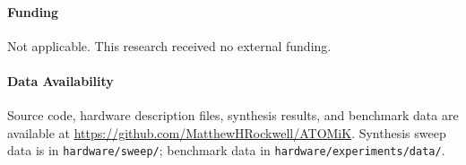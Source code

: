 \documentclass[11pt,letterpaper]{article}
\theoremstyle{plain}
\theoremstyle{definition}
\theoremstyle{remark}
\begin{document}
\paragraph{Funding} Not applicable. This research received no external funding.

\paragraph{Data Availability} Source code, hardware description files, synthesis results, and benchmark data are available at \url{https://github.com/MatthewHRockwell/ATOMiK}. Synthesis sweep data is in \texttt{hardware/sweep/}; benchmark data in \texttt{hardware/experiments/data/}.

\newpage



\end{document}
